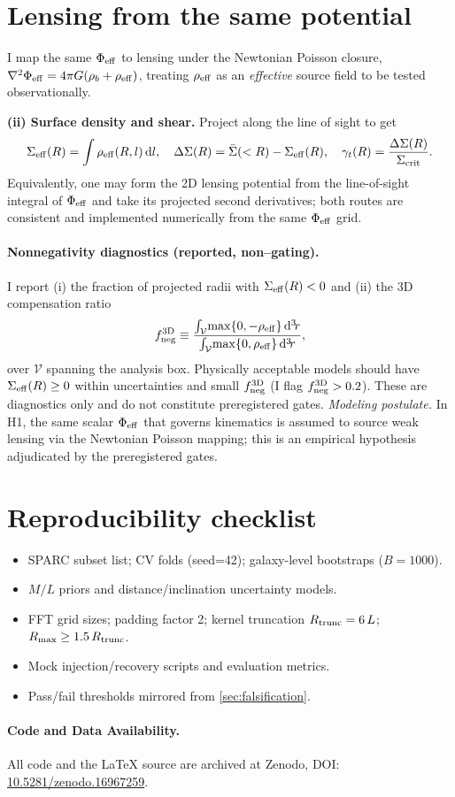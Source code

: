 		\section{Lensing from the same potential}\label{app:lensing}
I map the same $\Phi_{\rm eff}$ to lensing under the Newtonian Poisson closure,
$\nabla^2\Phi_{\rm eff}=4\pi G(\rho_b+\rho_{\rm eff})$,
treating $\rho_{\rm eff}$ as an \emph{effective} source field to be tested observationally.
		
		\textbf{(ii) Surface density and shear.} Project along the line of sight to get
		\[
		\Sigma_{\rm eff}(R)=\int \rho_{\rm eff}(R,l)\,\mathrm{d} l,\quad
		\Delta\Sigma(R)=\bar{\Sigma}(<R)-\Sigma_{\rm eff}(R),\quad
		\gamma_t(R)=\frac{\Delta\Sigma(R)}{\Sigma_{\rm crit}}.
		\]
		Equivalently, one may form the 2D lensing potential from the line-of-sight integral of $\Phi_{\mathrm{eff}}$ and take its projected second derivatives; both routes are consistent and implemented numerically from the same $\Phi_{\mathrm{eff}}$ grid.
\paragraph{Nonnegativity diagnostics (reported, non--gating).}
I report (i) the fraction of projected radii with $\Sigma_{\rm eff}(R)<0$ and (ii) the 3D compensation ratio
\[
f_{\rm neg}^{\rm 3D} \equiv \frac{\int_{\mathcal V}\!\max\{0,-\rho_{\rm eff}\}\,{\rm d}^3\!r}
{\int_{\mathcal V}\!\max\{0,\rho_{\rm eff}\}\,{\rm d}^3\!r},
\]
over $\mathcal V$ spanning the analysis box. Physically acceptable models should have $\Sigma_{\rm eff}(R)\ge 0$ within uncertainties and small $f_{\rm neg}^{\rm 3D}$ (I flag $f_{\rm neg}^{\rm 3D}>0.2$). These are diagnostics only and do not constitute preregistered gates.
\noindent\textit{Modeling postulate.} In H1, the same scalar $\Phi_{\rm eff}$ that governs kinematics is assumed to source weak lensing via the Newtonian Poisson mapping; this is an empirical hypothesis adjudicated by the preregistered gates.

		\section{Reproducibility checklist}\label{app:reprod}
		\begin{itemize}
			\item SPARC subset list; CV folds (seed=42); galaxy-level bootstraps ($B=1000$).
			\item $M/L$ priors and distance/inclination uncertainty models.
			\item FFT grid sizes; padding factor 2; kernel truncation $R_{\rm trunc}=6\,L$; $R_{\max}\ge 1.5\,R_{\rm trunc}$.
			\item Mock injection/recovery scripts and evaluation metrics.
			\item Pass/fail thresholds mirrored from \cref{sec:falsification}.
		\end{itemize}
		\paragraph{Code and Data Availability.}
  All code and the LaTeX source are archived at Zenodo, DOI: \href{https://doi.org/10.5281/zenodo.16967259}{10.5281/zenodo.16967259}.

		
		
		
	
